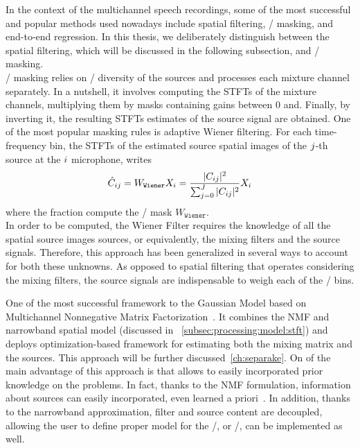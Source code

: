 \mynewline
{}
In the context of the multichannel speech recordings, some of the most successful and popular methods used nowadays
include spatial filtering, \TF/ masking, and end-to-end regression.
In this thesis, we deliberately distinguish between the spatial filtering, which will be discussed in the following subsection, and \TF/ masking.
\\\TF/ masking relies on \TF/ diversity of the sources and processes each mixture channel separately.
In a nutshell, it involves computing the \acp{STFT} of the mixture channels, multiplying them by masks containing gains between 0 and.
Finally, by inverting it, the resulting \acp{STFT} estimates of the source signal are obtained.
One of the most popular masking rules is adaptive Wiener filtering.
For each time-frequency bin, the \acp{STFT} of the estimated source spatial images of the $j$-th source at the $i$ microphone, writes
\begin{equation}
    \hat{C}_{ij} = W_\texttt{Wiener} X_{i} = \frac{|{C_{ij}}|^2}{\sum_{j=0}^{J} |{C_{ij}}|^2} X_{i}
\end{equation}
where the fraction compute the \TF/ mask $W_\texttt{Wiener}$.
\\In order to be computed, the Wiener Filter requires the knowledge of all the spatial source images sources, or equivalently, the mixing filters and the source signals.
Therefore,  this approach has been generalized in several ways to account for both these unknowns.
As opposed to spatial filtering that operates considering the mixing filters, the source signals are indispensable to weigh each of the \TF/ bins.


\mynewline
One of the most successful framework to the Gaussian Model based on Multichannel Nonnegative Matrix Factorization~.
It combines the \acf{NMF} and narrowband spatial model (discussed in ~\cref{subsec:processing:model:stft}) and deploys optimization-based framework for estimating both the mixing matrix and the sources.
This approach will be further discussed~\cref{ch:separake}.
On of the main advantage of this approach is that allows to easily incorporated prior knowledge on the problems.
In fact, thanks to the \ac{NMF} formulation, information about sources can easily incorporated, even learned a priori~.
In addition, thanks to the narrowband approximation, filter and source content are decoupled, allowing the user to define proper model for the \RIRs/, or \ReTFs/, can be implemented as well.

